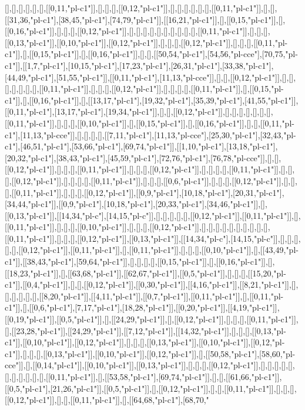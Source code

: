 [],[],[],[],[],[],[[0,11,"pl-c1"]],[],[],[],[[0,12,"pl-c1"]],[],[],[],[],[],[],[[0,11,"pl-c1"]],[],[],[[31,36,"pl-c1"],[38,45,"pl-c1"],[74,79,"pl-c1"]],[[16,21,"pl-c1"]],[],[[0,15,"pl-c1"]],[],[[0,16,"pl-c1"]],[],[],[],[[0,12,"pl-c1"]],[],[],[],[],[],[],[],[],[],[],[[0,11,"pl-c1"]],[],[],[],[[0,13,"pl-c1"]],[[0,10,"pl-c1"]],[[0,12,"pl-c1"]],[],[],[],[[0,12,"pl-c1"]],[],[],[],[[0,11,"pl-c1"]],[],[[0,15,"pl-c1"]],[],[[0,16,"pl-c1"]],[],[],[[50,54,"pl-c1"],[54,56,"pl-cce"],[70,75,"pl-c1"]],[[1,7,"pl-c1"],[10,15,"pl-c1"],[17,23,"pl-c1"],[26,31,"pl-c1"],[33,38,"pl-c1"],[44,49,"pl-c1"],[51,55,"pl-c1"]],[[0,11,"pl-c1"],[11,13,"pl-cce"]],[],[],[[0,12,"pl-c1"]],[],[],[],[],[],[],[],[[0,11,"pl-c1"]],[],[],[],[[0,12,"pl-c1"]],[],[],[],[],[[0,11,"pl-c1"]],[],[[0,15,"pl-c1"]],[],[[0,16,"pl-c1"]],[],[[13,17,"pl-c1"],[19,32,"pl-c1"],[35,39,"pl-c1"],[41,55,"pl-c1"]],[[0,11,"pl-c1"],[13,17,"pl-c1"],[19,34,"pl-c1"]],[],[],[[0,12,"pl-c1"]],[],[],[],[],[],[],[],[[0,11,"pl-c1"]],[],[],[],[[0,10,"pl-c1"]],[],[[0,15,"pl-c1"]],[],[[0,16,"pl-c1"]],[],[],[[0,11,"pl-c1"],[11,13,"pl-cce"]],[],[],[],[],[[7,11,"pl-c1"],[11,13,"pl-cce"],[25,30,"pl-c1"],[32,43,"pl-c1"],[46,51,"pl-c1"],[53,66,"pl-c1"],[69,74,"pl-c1"]],[[1,10,"pl-c1"],[13,18,"pl-c1"],[20,32,"pl-c1"],[38,43,"pl-c1"],[45,59,"pl-c1"],[72,76,"pl-c1"],[76,78,"pl-cce"]],[],[],[[0,12,"pl-c1"]],[],[],[],[[0,11,"pl-c1"]],[],[],[],[[0,12,"pl-c1"]],[],[],[],[],[[0,11,"pl-c1"]],[],[],[],[[0,12,"pl-c1"]],[],[],[],[],[[0,11,"pl-c1"]],[],[],[],[[0,6,"pl-c1"]],[],[],[],[[0,12,"pl-c1"]],[],[],[],[[0,11,"pl-c1"]],[],[],[],[[0,12,"pl-c1"]],[[0,9,"pl-c1"],[10,18,"pl-c1"],[20,31,"pl-c1"],[34,44,"pl-c1"]],[[0,9,"pl-c1"],[10,18,"pl-c1"],[20,33,"pl-c1"],[34,46,"pl-c1"]],[],[[0,13,"pl-c1"]],[[14,34,"pl-c"],[14,15,"pl-c"]],[],[],[],[],[],[[0,12,"pl-c1"]],[[0,11,"pl-c1"]],[],[[0,11,"pl-c1"]],[],[],[],[[0,10,"pl-c1"]],[],[],[],[[0,12,"pl-c1"]],[],[],[],[],[],[],[],[],[],[],[[0,11,"pl-c1"]],[],[],[],[[0,12,"pl-c1"]],[[0,13,"pl-c1"]],[[14,34,"pl-c"],[14,15,"pl-c"]],[],[],[],[],[],[[0,12,"pl-c1"]],[[0,11,"pl-c1"]],[],[[0,11,"pl-c1"]],[],[],[],[[0,10,"pl-c1"]],[],[[43,49,"pl-c1"]],[[38,43,"pl-c1"],[59,64,"pl-c1"]],[],[],[],[],[[0,15,"pl-c1"]],[],[[0,16,"pl-c1"]],[],[[18,23,"pl-c1"]],[],[[63,68,"pl-c1"]],[[62,67,"pl-c1"]],[[0,5,"pl-c1"]],[],[],[],[[15,20,"pl-c1"]],[[0,4,"pl-c1"]],[],[],[[0,12,"pl-c1"]],[[0,30,"pl-c1"]],[[4,16,"pl-c1"]],[[8,21,"pl-c1"]],[],[],[],[],[],[],[[8,20,"pl-c1"]],[[4,11,"pl-c1"]],[[0,7,"pl-c1"]],[[0,11,"pl-c1"]],[],[[0,11,"pl-c1"]],[],[[0,6,"pl-c1"],[7,17,"pl-c1"],[18,28,"pl-c1"]],[[0,20,"pl-c1"]],[[4,19,"pl-c1"]],[[0,19,"pl-c1"]],[[0,5,"pl-c1"]],[],[[24,29,"pl-c1"]],[],[[0,12,"pl-c1"]],[],[],[],[[0,11,"pl-c1"]],[],[[23,28,"pl-c1"]],[[24,29,"pl-c1"]],[[7,12,"pl-c1"]],[[14,32,"pl-c1"]],[],[],[],[[0,13,"pl-c1"]],[[0,10,"pl-c1"]],[[0,12,"pl-c1"]],[],[],[],[[0,13,"pl-c1"]],[[0,10,"pl-c1"]],[[0,12,"pl-c1"]],[],[],[],[[0,13,"pl-c1"]],[[0,10,"pl-c1"]],[[0,12,"pl-c1"]],[],[[50,58,"pl-c1"],[58,60,"pl-cce"]],[],[[0,14,"pl-c1"]],[[0,10,"pl-c1"]],[[0,13,"pl-c1"]],[],[],[],[[0,12,"pl-c1"]],[],[],[],[],[],[],[],[],[],[],[],[[0,11,"pl-c1"]],[],[[53,58,"pl-c1"],[69,74,"pl-c1"]],[],[],[[61,66,"pl-c1"]],[[0,5,"pl-c1"],[21,26,"pl-c1"]],[[0,5,"pl-c1"]],[],[[0,12,"pl-c1"]],[],[],[[0,11,"pl-c1"]],[],[],[],[[0,12,"pl-c1"]],[],[],[[0,11,"pl-c1"]],[],[[64,68,"pl-c1"],[68,70,"